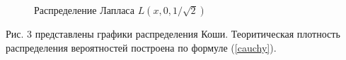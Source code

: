 \documentclass[12pt]{article}
\newcommand{\lskip}{\hfill\break}
\begin{document}
\begin{flushleft}
\begin{figure}[h!]
\begin{minipage}[h]{0.325\linewidth}
        \end{minipage}
        \caption{Распределение Лапласа $L(x, 0, 1/\sqrt{2})$}
    \end{figure}
    \lskip

     Рис. 3 представлены графики распределения Коши. Теоритическая плотность распределения вероятностей построена по формуле (\ref{cauchy}).


\end{flushleft}
\end{document}
